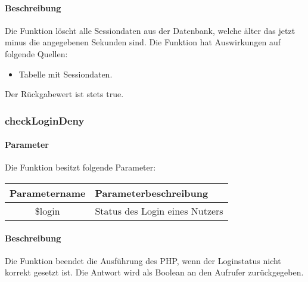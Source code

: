\paragraph{Beschreibung} Die Funktion löscht alle Sessiondaten aus der Datenbank, welche älter das jetzt minus die angegebenen Sekunden sind. Die Funktion hat Auswirkungen auf folgende Quellen:
\begin{itemize}
	\item Tabelle mit Sessiondaten.
\end{itemize}
Der Rückgabewert ist stets {\glqq true\grqq}.
\subsubsection{checkLoginDeny}
\paragraph{Parameter} Die Funktion besitzt folgende Parameter:
\begin{table}[H]
	\begin{tabular}{|c|p{11cm}|}
		\hline
		\textbf{Parametername} & \textbf{Parameterbeschreibung} \\ \hline
		\$login & Status des Login eines Nutzers \\ \hline
	\end{tabular}
\end{table}
\paragraph{Beschreibung} Die Funktion beendet die Ausführung des PHP, wenn der Loginstatus nicht korrekt gesetzt ist. Die Antwort wird als Boolean an den Aufrufer zurückgegeben.
